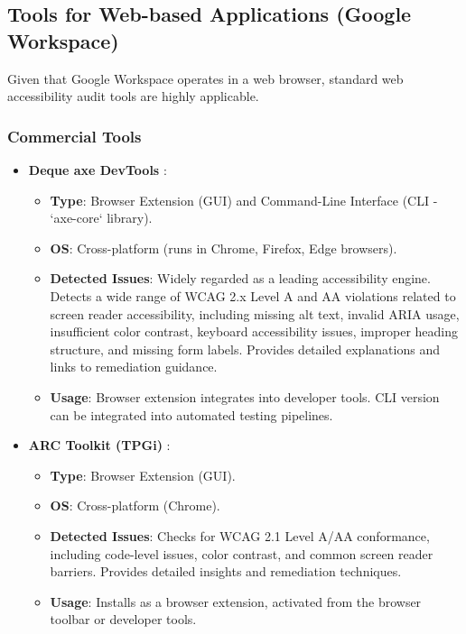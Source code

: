 \subsection{Tools for Web-based Applications (Google Workspace)}

Given that Google Workspace operates in a web browser, standard web accessibility audit tools are highly applicable.

\subsubsection{Commercial Tools}
\begin{itemize}
    \item \textbf{Deque axe DevTools} \cite{AxeDevTools}:
        \begin{itemize}
            \item \textbf{Type}: Browser Extension (GUI) and Command-Line Interface (CLI - `axe-core` library).
            \item \textbf{OS}: Cross-platform (runs in Chrome, Firefox, Edge browsers).
            \item \textbf{Detected Issues}: Widely regarded as a leading accessibility engine. Detects a wide range of WCAG 2.x Level A and AA violations related to screen reader accessibility, including missing alt text, invalid ARIA usage, insufficient color contrast, keyboard accessibility issues, improper heading structure, and missing form labels. Provides detailed explanations and links to remediation guidance.
            \item \textbf{Usage}: Browser extension integrates into developer tools. CLI version can be integrated into automated testing pipelines.
        \end{itemize}
    \item \textbf{ARC Toolkit (TPGi)} \cite{ARCToolkit}:
        \begin{itemize}
            \item \textbf{Type}: Browser Extension (GUI).
            \item \textbf{OS}: Cross-platform (Chrome).
            \item \textbf{Detected Issues}: Checks for WCAG 2.1 Level A/AA conformance, including code-level issues, color contrast, and common screen reader barriers. Provides detailed insights and remediation techniques.
            \item \textbf{Usage}: Installs as a browser extension, activated from the browser toolbar or developer tools.
        \end{itemize}
\end{itemize}

